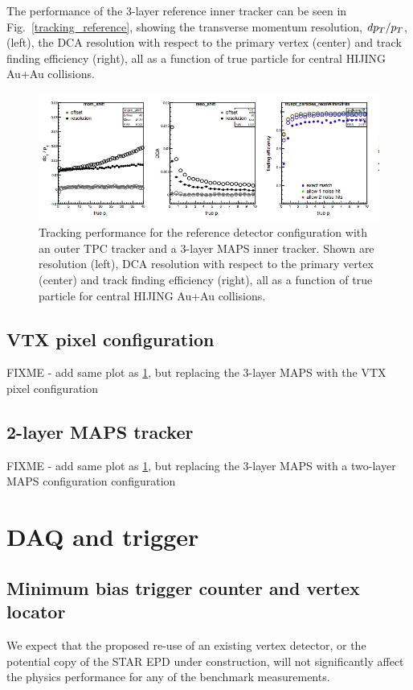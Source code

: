 The performance of the 3-layer reference inner tracker can be seen in Fig.~\ref{tracking_reference}, showing the 
transverse momentum resolution, $d\mbox{${p_T}$}/\mbox{${p_T}$}$, (left), the DCA resolution with respect to the primary vertex (center) 
and track finding efficiency (right), all as a function of true particle \pt for central HIJING Au+Au collisions. 
\begin{figure}[hbt]
  \centering
  \includegraphics[width=0.9\linewidth]{figs/tracking_performance_reference}
  \caption{Tracking performance for the reference detector configuration with an
  outer TPC tracker and a 3-layer MAPS inner tracker. Shown are \pt resolution (left), 
  DCA resolution with respect to the primary vertex (center) and track finding efficiency (right), all as a function
of true particle \pt for central HIJING Au+Au collisions.}
  \label{fig:tracking_reference}
\end{figure}

\subsection{VTX pixel configuration} FIXME - add same plot as \ref{fig:tracking_reference}, but replacing the 3-layer MAPS with the VTX pixel 
configuration
\subsection{2-layer MAPS tracker} FIXME - add same plot as \ref{fig:tracking_reference}, but replacing the 3-layer MAPS with a two-layer MAPS configuration
configuration

\section{DAQ and trigger}
\subsection{Minimum bias trigger counter and vertex locator}
We expect that the proposed re-use of an existing vertex detector, or the potential copy of the STAR EPD under construction, will not significantly affect
the physics performance for any of the benchmark measurements.
